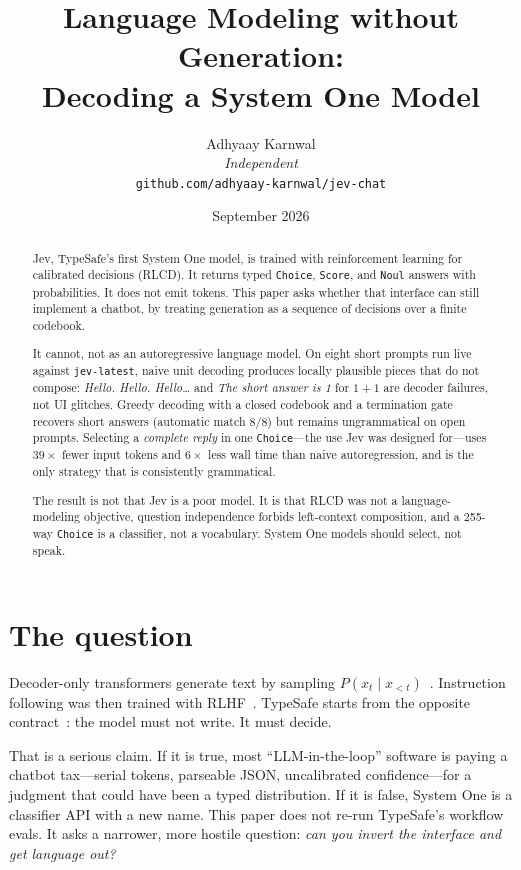 \documentclass[11pt,twocolumn]{article}
\title{\vspace{-1.1em}Language Modeling without Generation:\\
Decoding a System One Model}
\author{Adhyaay Karnwal\\[2pt]
{\large\itshape Independent}\\[4pt]
{\small\texttt{github.com/adhyaay-karnwal/jev-chat}}}
\date{September 2026}
\begin{document}
\maketitle
\thispagestyle{empty}

\begin{abstract}
Jev, TypeSafe's first System One model, is trained with reinforcement learning for calibrated decisions (RLCD). It returns typed \texttt{Choice}, \texttt{Score}, and \texttt{Noul} answers with probabilities. It does not emit tokens. This paper asks whether that interface can still implement a chatbot, by treating generation as a sequence of decisions over a finite codebook.

It cannot, not as an autoregressive language model. On eight short prompts run live against \texttt{jev-latest}, naive unit decoding produces locally plausible pieces that do not compose: \emph{Hello. Hello. Hello\ldots} and \emph{The short answer is 1} for $1{+}1$ are decoder failures, not UI glitches. Greedy decoding with a closed codebook and a termination gate recovers short answers (automatic match $8/8$) but remains ungrammatical on open prompts. Selecting a \emph{complete reply} in one \texttt{Choice}---the use Jev was designed for---uses $39\times$ fewer input tokens and $6\times$ less wall time than naive autoregression, and is the only strategy that is consistently grammatical.

The result is not that Jev is a poor model. It is that RLCD was not a language-modeling objective, question independence forbids left-context composition, and a 255-way \texttt{Choice} is a classifier, not a vocabulary. System One models should select, not speak.
\end{abstract}

\section{The question}

Decoder-only transformers generate text by sampling $P(x_t \mid x_{<t})$~\cite{shannon1948,sutskever2014,vaswani2017,brown2020}. Instruction following was then trained with RLHF~\cite{christiano2017,ouyang2022}. TypeSafe starts from the opposite contract~\cite{almeida2026jev,typesafe2026docs}: the model must not write. It must decide.

That is a serious claim. If it is true, most ``LLM-in-the-loop'' software is paying a chatbot tax---serial tokens, parseable JSON, uncalibrated confidence---for a judgment that could have been a typed distribution. If it is false, System One is a classifier API with a new name. This paper does not re-run TypeSafe's workflow evals. It asks a narrower, more hostile question: \emph{can you invert the interface and get language out?}
\end{document}
